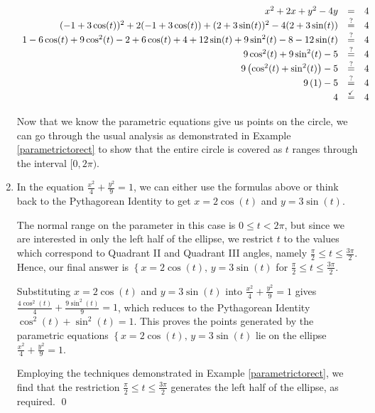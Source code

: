 \documentclass{ximera}
\begin{document}
\begin{ex}
\begin{enumerate}
\[\begin{array}{rcl}
x^2 + 2x + y^2 - 4y & = & 4  \\
(-1+3\cos(t))^2 + 2(-1+3\cos(t)) + (2+3\sin(t))^2 - 4(2+3\sin(t)) & \stackrel{\text{?}}{=} & 4  \\
1  - 6\cos(t) + 9\cos^{2}(t) - 2 + 6\cos(t) + 4 + 12\sin(t) + 9\sin^{2}(t) - 8 - 12\sin(t) & \stackrel{\text{?}}{=} & 4  \\
9\cos^{2}(t) + 9\sin^{2}(t) -5 & \stackrel{\text{?}}{=} & 4 \\
9\left(\cos^{2}(t) + \sin^{2}(t)\right) -5 & \stackrel{\text{?}}{=} & 4  \\
9\left(1\right) -5 & \stackrel{\text{?}}{=} & 4 \\
4 & \stackrel{\text{\checkmark}}{=} & 4  \\ \end{array} \]

Now that we know the parametric equations give us points on the circle, we can go through the usual analysis as demonstrated in Example \ref{parametrictorect}  to show that the entire circle is covered as $t$ ranges through the interval $[0,2\pi)$.

\item  In the equation $\frac{x^2}{4} + \frac{y^2}{9} = 1$, we can either use the formulas above or think back to the Pythagorean Identity to get  $x = 2\cos(t)$ and $y = 3\sin(t)$.  

\smallskip

The normal range on the parameter in this case is $0 \leq t < 2\pi$, but since we are interested in only the left half of the ellipse, we restrict $t$ to the values which correspond to Quadrant II and Quadrant III angles, namely  $\frac{\pi}{2} \leq t \leq \frac{3\pi}{2}$.   Hence, our final answer is $\left\{  x = 2\cos(t), \,   y = 3\sin(t) \right.$ for $\frac{\pi}{2} \leq t \leq \frac{3\pi}{2}$.  

\smallskip

Substituting $x = 2\cos(t)$ and $y = 3\sin(t)$ into  $\frac{x^2}{4} + \frac{y^2}{9} = 1$ gives $\frac{4\cos^{2}(t)}{4} + \frac{9 \sin^{2}(t)}{9} = 1$, which reduces to the Pythagorean Identity $\cos^{2}(t) + \sin^{2}(t) = 1$.  This proves the points generated by the parametric equations  $\left\{  x = 2\cos(t), \,   y = 3\sin(t) \right.$ lie on the ellipse $\frac{x^2}{4} + \frac{y^2}{9} = 1$. 

\smallskip

 Employing the techniques demonstrated in Example \ref{parametrictorect}, we find that the restriction $\frac{\pi}{2} \leq t \leq \frac{3\pi}{2}$ generates the left half of the ellipse, as required.  \qed

\end{enumerate}

\end{ex}
\end{document}
